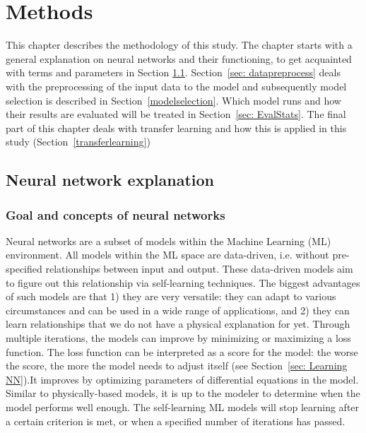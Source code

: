 \documentclass[twocolumn, 10pt, a4paper]{memoir}
\begin{document}
	
	
	
	\chapter{Methods} \label{ch: methods}
	This chapter describes the methodology of this study. The chapter starts with a general explanation on neural networks and their functioning, to get acquainted with terms and parameters in Section \ref{sec: NN explain}. Section~\ref{sec: datapreprocess} deals with the preprocessing of the input data to the model and subsequently model selection is described in Section~\ref{modelselection}. Which model runs and how their results are evaluated will be treated in Section~\ref{sec: EvalStats}. The final part of this chapter deals with transfer learning and how this is applied in this study (Section~\ref{transferlearning})
	\section{Neural network explanation} \label{sec: NN explain}
	\subsection{Goal and concepts of neural networks} \label{sec: NNConcepts}
	Neural networks are a subset of models within the Machine Learning (ML) environment. All models within the ML space are data-driven, i.e. without pre-specified relationships between input and output. These data-driven models aim to figure out this relationship via self-learning techniques.
	The biggest advantages of such models are that 1) they are very versatile: they can adapt to various circumstances and can be used in a wide range of applications, and 2) they can learn relationships that we do not have a physical explanation for yet. Through multiple iterations, the models can improve by minimizing or maximizing a loss function. The loss function can be interpreted as a score for the model: the worse the score, the more the model needs to adjust itself (see Section~\ref{sec: Learning NN}).It improves by optimizing parameters of differential equations in the model. Similar to physically-based models, it is up to the modeler to determine when the model performs well enough. The self-learning ML models will stop learning after a certain criterion is met, or when a specified number of iterations has passed.
	
\end{document}

